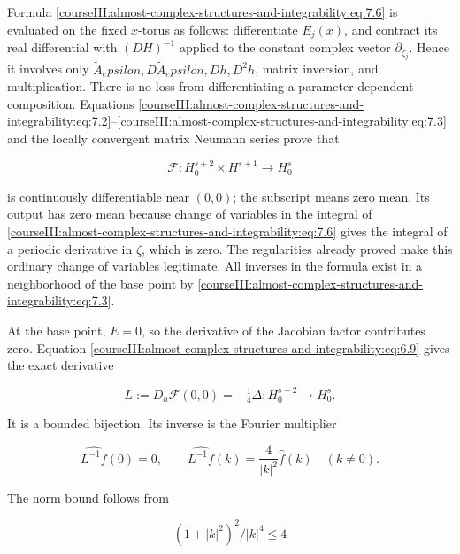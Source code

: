 Formula \eqref{courseIII:almost-complex-structures-and-integrability:eq:7.6} is evaluated on the fixed \(x\)-torus as follows: differentiate \(E_j(x)\), and contract its real differential with \((DH)^{-1}\) applied to the constant complex vector \(\partial_{\zeta_j}\). Hence it involves only \(\widetilde A_epsilon,D\widetilde A_epsilon,Dh,D^2h\), matrix inversion, and multiplication. There is no loss from differentiating a parameter-dependent composition. Equations \eqref{courseIII:almost-complex-structures-and-integrability:eq:7.2}--\eqref{courseIII:almost-complex-structures-and-integrability:eq:7.3} and the locally convergent matrix Neumann series prove that

\begin{equation}
\mathcal F:H^{s+2}_0\times H^{s+1}
\longrightarrow H^s_0
\label{courseIII:almost-complex-structures-and-integrability:eq:7.7}
\end{equation}

is continuously differentiable near \((0,0)\); the subscript means zero mean. Its output has zero mean because change of variables in the integral of \eqref{courseIII:almost-complex-structures-and-integrability:eq:7.6} gives the integral of a periodic derivative in \(\zeta\), which is zero. The regularities already proved make this ordinary change of variables legitimate. All inverses in the formula exist in a neighborhood of the base point by \eqref{courseIII:almost-complex-structures-and-integrability:eq:7.3}.

At the base point, \(E=0\), so the derivative of the Jacobian factor contributes zero. Equation \eqref{courseIII:almost-complex-structures-and-integrability:eq:6.9} gives the exact derivative

\begin{equation}
L:=D_h\mathcal F(0,0)=-\tfrac14\Delta:
H^{s+2}_0\longrightarrow H^s_0.
\label{courseIII:almost-complex-structures-and-integrability:eq:7.8}
\end{equation}

It is a bounded bijection. Its inverse is the Fourier multiplier

\begin{equation}
\widehat{L^{-1}f}(0)=0,
\qquad
\widehat{L^{-1}f}(k)=\frac{4}{|k|^2}\widehat f(k)
\quad(k\ne0).
\label{courseIII:almost-complex-structures-and-integrability:eq:7.9}
\end{equation}

The norm bound follows from

\[
(1+|k|^2)^2/|k|^4\leq4
\]

